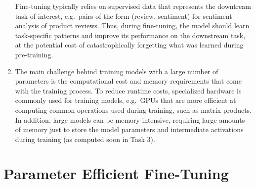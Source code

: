 \documentclass[11pt,a4paper]{article}
\begin{document}
\begin{enumerate}[label=(\alph*)]
          Fine-tuning typically relies on supervised data that represents the
          downtream task of interest, e.g.\ pairs of the form
          (review, sentiment) for sentiment analysis of product reviews.
          Thus, during fine-tuning, the model should learn task-specific
          patterns and improve its performance on the downstream task, at the
          potential cost of catastrophically forgetting what was learned during
          pre-training.
    \item The main challenge behind training models with a large number of
          parameters is the computational cost and memory requirements that come
          with the training process.
          To reduce runtime costs, specialized hardware is commonly used for
          training models, e.g.\ GPUs that are more efficient at computing
          common operations used during training, such as matrix products.
          In addition, large models can be memory-intensive, requiring large
          amounts of memory just to store the model parameters and intermediate
          activations during training (as computed soon in Task 3).
\end{enumerate}

\section{Parameter Efficient Fine-Tuning}
\end{document}
